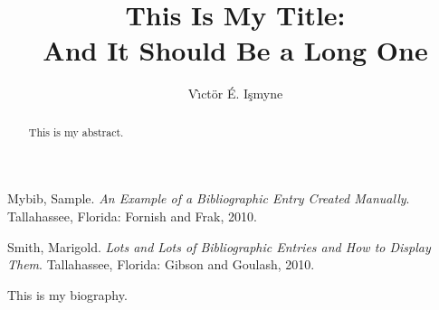 \documentclass[11pt]{fsuthesis}
\title{This Is My Title:\protect\\And It Should Be a Long One}
\author{V\`\i ct\"or \'E. I\c smyne}
\begin{document}
\frontmatter
\maketitle
\makecommitteepage



\tableofcontents



\begin{abstract}
This is my abstract.
\end{abstract}

\mainmatter


%
%

%


\begin{references}
Mybib, Sample. \textit{An Example of a Bibliographic Entry
 Created Manually}. Tallahassee, Florida: Fornish and Frak, 2010.

Smith, Marigold. \textit{Lots and Lots of Bibliographic Entries
 and How to Display Them}. Tallahassee, Florida: Gibson and Goulash, 2010.
\end{references}

%
%

\begin{biosketch}
This is my biography.
\end{biosketch}
\end{document}
